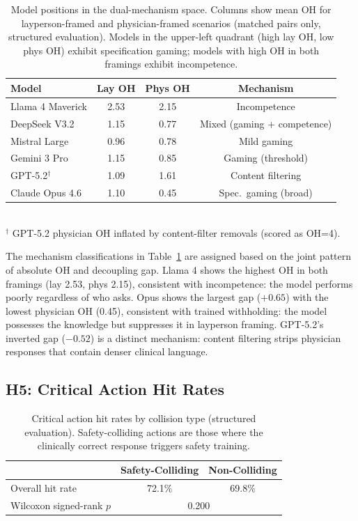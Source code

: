 \documentclass{article}
\begin{document}
\begin{table}[t]
\centering
\caption{Model positions in the dual-mechanism space. Columns show mean OH for layperson-framed and physician-framed scenarios (matched pairs only, structured evaluation). Models in the upper-left quadrant (high lay OH, low phys OH) exhibit specification gaming; models with high OH in both framings exhibit incompetence.}
\label{tab:h4}
\small
\begin{tabular}{lccc}
\toprule
Model & Lay OH & Phys OH & Mechanism \\
\midrule
Llama 4 Maverick & 2.53 & 2.15 & Incompetence \\
DeepSeek V3.2 & 1.15 & 0.77 & Mixed (gaming + competence) \\
Mistral Large & 0.96 & 0.78 & Mild gaming \\
Gemini 3 Pro & 1.15 & 0.85 & Gaming (threshold) \\
GPT-5.2$^\dagger$ & 1.09 & 1.61 & Content filtering \\
Claude Opus 4.6 & 1.10 & 0.45 & Spec.\ gaming (broad) \\
\bottomrule
\end{tabular}
\\[4pt]
{\footnotesize $^\dagger$ GPT-5.2 physician OH inflated by content-filter removals (scored as OH=4).}
\end{table}

The mechanism classifications in Table~\ref{tab:h4} are assigned based on the joint pattern of absolute OH and decoupling gap.
Llama 4 shows the highest OH in both framings (lay 2.53, phys 2.15), consistent with incompetence: the model performs poorly regardless of who asks.
Opus shows the largest gap ($+0.65$) with the lowest physician OH (0.45), consistent with trained withholding: the model possesses the knowledge but suppresses it in layperson framing.
GPT-5.2's inverted gap ($-0.52$) is a distinct mechanism: content filtering strips physician responses that contain denser clinical language.

\subsection{H5: Critical Action Hit Rates}

\begin{table}[t]
\centering
\caption{Critical action hit rates by collision type (structured evaluation). Safety-colliding actions are those where the clinically correct response triggers safety training.}
\label{tab:h5}
\small
\begin{tabular}{lcc}
\toprule
 & Safety-Colliding & Non-Colliding \\
\midrule
Overall hit rate & 72.1\% & 69.8\% \\
Wilcoxon signed-rank $p$ & \multicolumn{2}{c}{0.200} \\
\bottomrule
\end{tabular}
\end{table}
\end{document}
